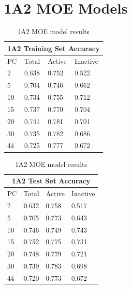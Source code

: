 
\section{1A2 MOE Models}

\begin{table}[!htbp]
\begin{minipage}{.5\linewidth}
\centering
\begin{tabular}{|l|l|l|l|}
\hline
\multicolumn{4}{|c|}{1A2 Training Set Accuracy}   \\ \hline
PC & Total          & Active          & Inactive  \\ \hline
2  & 0.638          & 0.752           & 0.522     \\ \hline
5  & 0.704          & 0.746           & 0.662     \\ \hline
10 & 0.734          & 0.755           & 0.712     \\ \hline
15 & 0.737          & 0.770           & 0.704     \\ \hline
20 & 0.741          & 0.781           & 0.701     \\ \hline
30 & 0.735          & 0.782           & 0.686     \\ \hline
44 & 0.725          & 0.777           & 0.672     \\ \hline
\end{tabular}
\end{minipage}
\begin{minipage}{.5\linewidth}
\centering
\begin{tabular}{|l|l|l|l|}
\hline
\multicolumn{4}{|c|}{1A2 Test Set Accuracy}     \\ \hline
PC & Total          & Active          & Inactive \\ \hline
2  & 0.632          & 0.758           & 0.517   \\ \hline
5  & 0.705          & 0.773           & 0.643   \\ \hline
10 & 0.746          & 0.749           & 0.743   \\ \hline
15 & 0.752          & 0.775           & 0.731   \\ \hline
20 & 0.748          & 0.779           & 0.721   \\ \hline
30 & 0.739          & 0.783           & 0.698   \\ \hline
44 & 0.720          & 0.773           & 0.672   \\ \hline
\end{tabular}
\end{minipage}
\caption{1A2 MOE model results}
\end{table}

